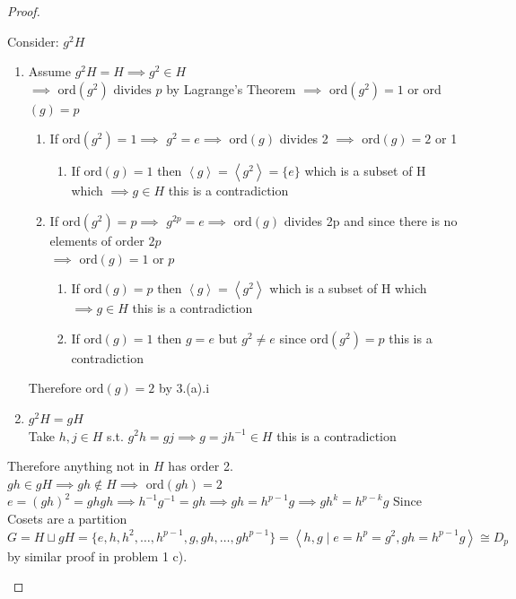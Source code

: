 \documentclass[12pt, letterpaper]{article}
\theoremstyle{definition}
\newcommand{\ang}[1]{\left\langle #1 \right\rangle}
\begin{document}
\begin{proof}
\begin{enumerate}
        Consider:  $g^2H$
        \begin{enumerate}
            \item Assume $g^2H=H \implies g^2 \in H$\\
            $\implies$ ord$(g^2) \text{ divides } p$ by Lagrange's Theorem $\implies$ ord$(g^2)=1$ or ord$(g)=p$
            \begin{enumerate}
                \item If ord$(g^2)=1 \implies$ $g^{2}=e \implies$ ord$(g)$ divides 2 $\implies$ ord$(g)=2$ or 1
                \begin{enumerate}
                    \item If ord$(g)=1$ then $\ang{g}=\ang{g^2}=\{e\}$ which is a subset of H which $\implies g\in H$ this is a contradiction
                \end{enumerate}
                \item If ord$(g^2)=p \implies$ $g^{2p}=e \implies$ ord$(g)$ divides 2p and since there is no elements of order $2p$\\
                $\implies$ ord$(g)=1$ or $p$
                \begin{enumerate}
                    \item If ord$(g)=p$ then $\ang{g}=\ang{g^2}$ which is a subset of H which $\implies g\in H$ this is a contradiction
                    \item If ord$(g)=1$ then $g=e$ but $g^2\neq e$ since ord$(g^2)=p$ this is a contradiction
                \end{enumerate}
            \end{enumerate}
            Therefore ord$(g)=2$ by 3.(a).i
            \item $g^2H=gH$\\
            Take $h,j \in H$ s.t. $g^2h=gj \implies g=jh^{-1} \in H$ this is a contradiction
        \end{enumerate}
        Therefore anything not in $H$ has order 2.\\
        $gh\in gH \implies gh \notin H \implies$ ord$(gh)=2$\\
        $e=(gh)^2=ghgh \implies h^{-1}g^{-1}=gh \implies gh=h^{p-1}g \implies gh^{k}=h^{p-k}g$
        Since Cosets are a partition\\ 
        $G=H\sqcup gH = \{e,h,h^2,\dots,h^{p-1},g,gh,\dots,gh^{p-1}\}=\ang{h,g \mid e=h^p=g^2, gh=h^{p-1}g} \cong D_p$ by similar proof in problem 1 c).
    \end{enumerate}
\end{proof}
\newpage
\end{document}
